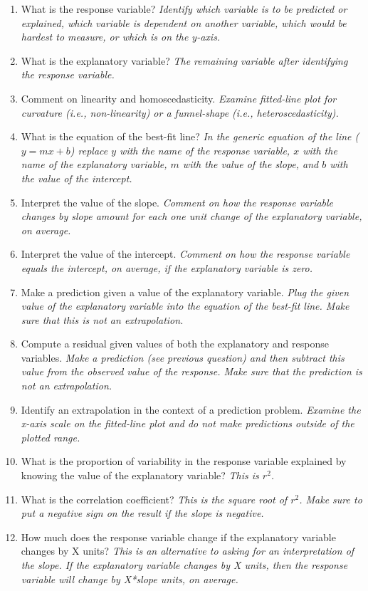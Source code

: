 \documentclass[10pt,openany]{book}\usepackage[]{graphicx}\usepackage[]{color}
\begin{document}
\begin{enumerate}
  \item What is the response variable?  \textit{Identify which variable is to be predicted or explained, which variable is dependent on another variable, which would be hardest to measure, or which is on the y-axis.}
  \item What is the explanatory variable?  \textit{The remaining variable after identifying the response variable.}
  \item Comment on linearity and homoscedasticity. \textit{Examine fitted-line plot for curvature (i.e., non-linearity) or a funnel-shape (i.e., heteroscedasticity).}
  \item What is the equation of the best-fit line?  \textit{In the generic equation of the line ($y=mx+b$) replace $y$ with the name of the response variable, $x$ with the name of the explanatory variable, $m$ with the value of the slope, and $b$ with the value of the intercept.}
  \item Interpret the value of the slope. \textit{Comment on how the response variable changes by slope amount for each one unit change of the explanatory variable, on average.}
  \item Interpret the value of the intercept. \textit{Comment on how the response variable equals the intercept, on average, if the explanatory variable is zero.}
  \item Make a prediction given a value of the explanatory variable. \textit{Plug the given value of the explanatory variable into the equation of the best-fit line. Make sure that this is not an extrapolation.}
  \item Compute a residual given values of both the explanatory and response variables. \textit{Make a prediction (see previous question) and then subtract this value from the observed value of the response. Make sure that the prediction is not an extrapolation.}
  \item Identify an extrapolation in the context of a prediction problem. \textit{Examine the x-axis scale on the fitted-line plot and do not make predictions outside of the plotted range.}
  \item What is the proportion of variability in the response variable explained by knowing the value of the explanatory variable?  \textit{This is $r^{2}$.}
  \item What is the correlation coefficient?  \textit{This is the square root of $r^{2}$. Make sure to put a negative sign on the result if the slope is negative.}
  \item How much does the response variable change if the explanatory variable changes by X units?  \textit{This is an alternative to asking for an interpretation of the slope. If the explanatory variable changes by X units, then the response variable will change by X*slope units, on average.}
\end{enumerate}
\end{document}
